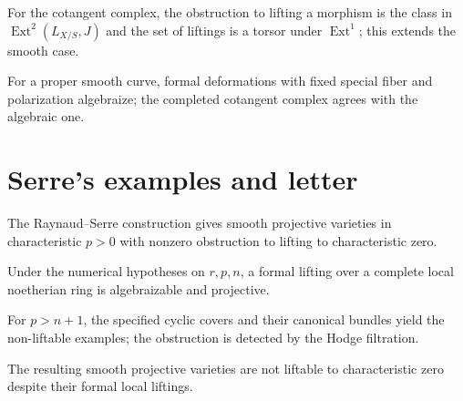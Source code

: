\begin{theorem}\label{fga-thm-8-5-27}
For the cotangent complex, the obstruction to lifting a morphism is the class in
$\operatorname{Ext}^2(L_{X/S},J)$ and the set of liftings is a torsor under
$\operatorname{Ext}^1$; this extends the smooth case.
\end{theorem}
\begin{corollary}\label{fga-cor-8-5-32}
For a proper smooth curve, formal deformations with fixed special fiber and
polarization algebraize; the completed cotangent complex agrees with the
algebraic one.
\end{corollary}

\section{Serre's examples and letter}
\begin{proposition}\label{fga-prop-8-6-2}
The Raynaud--Serre construction gives smooth projective varieties in
characteristic $p>0$ with nonzero obstruction to lifting to characteristic zero.
\end{proposition}
\begin{proposition}\label{fga-prop-8-6-4}
Under the numerical hypotheses on $r,p,n$, a formal lifting over a
complete local noetherian ring is algebraizable and projective.
\end{proposition}
\begin{proposition}\label{fga-prop-8-6-6}
For $p>n+1$, the specified cyclic covers and their canonical bundles yield the
non-liftable examples; the obstruction is detected by the Hodge filtration.
\end{proposition}
\begin{corollary}\label{fga-cor-8-6-7}
The resulting smooth projective varieties are not liftable to characteristic
zero despite their formal local liftings.
\end{corollary}
